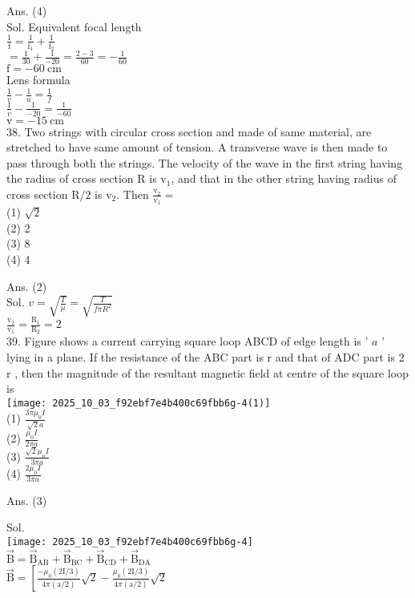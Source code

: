 \documentclass[10pt]{article}
\begin{document}
Ans. (4)\\
Sol. Equivalent focal length\\
\(\frac{1}{\mathrm{f}}=\frac{1}{\mathrm{f}_{1}}+\frac{1}{\mathrm{f}_{2}}\)\\
\(=\frac{1}{30}+\frac{1}{-20}=\frac{2-3}{60}=-\frac{1}{60}\)\\
\(\mathrm{f}=-60 \mathrm{~cm}\)\\
Lens formula\\
\(\frac{1}{v}-\frac{1}{u}=\frac{1}{f}\)\\
\(\frac{1}{v}-\frac{1}{-20}=\frac{1}{-60}\)\\
\(\mathrm{v}=-15 \mathrm{~cm}\)\\
38. Two strings with circular cross section and made of same material, are stretched to have same amount of tension. A transverse wave is then made to pass through both the strings. The velocity of the wave in the first string having the radius of cross section R is \(\mathrm{v}_{1}\), and that in the other string having radius of cross section \(\mathrm{R} / 2\) is \(\mathrm{v}_{2}\). Then \(\frac{\mathrm{v}_{2}}{\mathrm{v}_{1}}=\)\\
(1) \(\sqrt{2}\)\\
(2) 2\\
(3) 8\\
(4) 4

Ans. (2)\\
Sol. \(v=\sqrt{\frac{T}{\mu}}=\sqrt{\frac{T}{f \pi R^{2}}}\)\\
\(\frac{\mathrm{v}_{2}}{\mathrm{v}_{1}}=\frac{\mathrm{R}_{1}}{\mathrm{R}_{2}}=2\)\\
39. Figure shows a current carrying square loop ABCD of edge length is ' \(a\) ' lying in a plane. If the resistance of the ABC part is r and that of ADC part is 2 r , then the magnitude of the resultant magnetic field at centre of the square loop is\\
\texttt{[image: 2025\_10\_03\_f92ebf7e4b400c69fbb6g-4(1)]}\\
(1) \(\frac{3 \pi \mu_{0} I}{\sqrt{2} a}\)\\
(2) \(\frac{\mu_{0} I}{2 \pi a}\)\\
(3) \(\frac{\sqrt{2} \mu_{o} I}{3 \pi a}\)\\
(4) \(\frac{2 \mu_{0} I}{3 \pi a}\)

Ans. (3)

Sol.\\
\texttt{[image: 2025\_10\_03\_f92ebf7e4b400c69fbb6g-4]}\\
\(\overrightarrow{\mathrm{B}}=\overrightarrow{\mathrm{B}}_{\mathrm{AB}}+\overrightarrow{\mathrm{B}}_{\mathrm{BC}}+\overrightarrow{\mathrm{B}}_{\mathrm{CD}}+\overrightarrow{\mathrm{B}}_{\mathrm{DA}}\)\\
\(\overrightarrow{\mathrm{B}}=\left[\frac{-\mu_{0}(2 \mathrm{I} / 3)}{4 \pi(\mathrm{a} / 2)} \sqrt{2}-\frac{\mu_{0}(2 \mathrm{I} / 3)}{4 \pi(\mathrm{a} / 2)} \sqrt{2}\right.\)
\end{document}
